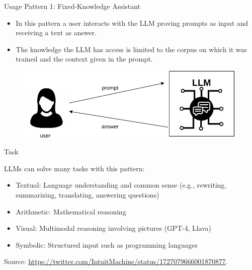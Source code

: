 \documentclass[handout]{beamer}
\begin{document}
\begin{frame}{Usage Pattern 1: Fixed-Knowledge Assistant}
\begin{scriptsize}
\begin{itemize}
\item In this pattern a user interacts with the LLM proving prompts as input and receiving a text as answer.
\item The knowledge the LLM has access is limited to the corpus on which it was trained and the context given in the prompt.
\end{itemize}

 \begin{figure}[h]
        	\includegraphics[scale = 0.6]{pics/assistantpattern.pdf}
        \end{figure}  


\end{scriptsize}
\end{frame}


\begin{frame}{Task}
\begin{scriptsize}
LLMs can solve many tasks with this pattern:

\begin{itemize}
\item Textual: Language understanding and common sense (e.g., rewriting, summarizing, translating, answering questions)
\item Arithmetic: Mathematical reasoning  
\item Visual: Multimodal reasoning involving pictures (GPT-4, Llava)
\item Symbolic: Structured input such as programming languages
\end{itemize}
Source: \url{https://twitter.com/IntuitMachine/status/1727079666001870877}.
\end{scriptsize}
\end{frame}
\end{document}

